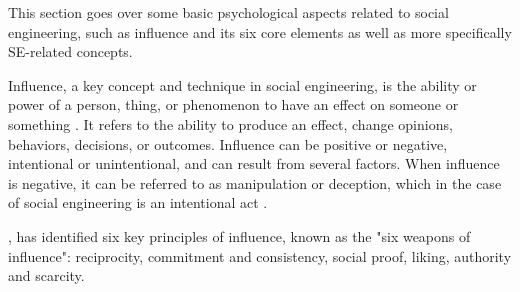 This section goes over some basic psychological aspects related to social engineering, such as influence and its six core elements as well as more specifically SE-related concepts.

Influence, a key concept and technique in social engineering, is the ability or power of a person, thing, or phenomenon to have an effect on someone or something \citep{cialdiniInfluenceSciencePractice1993}. It refers to the ability to produce an effect, change opinions, behaviors, decisions, or outcomes. Influence can be positive or negative, intentional or unintentional, and can result from several factors. When influence is negative, it can be referred to as manipulation or deception, which in the case of social engineering is an intentional act \citep{mitnickArtDeceptionControlling2003}.

\cite{cialdiniInfluenceSciencePractice1993}, has identified six key principles of influence, known as the "six weapons of influence": reciprocity, commitment and consistency, social proof, liking, authority and scarcity.

